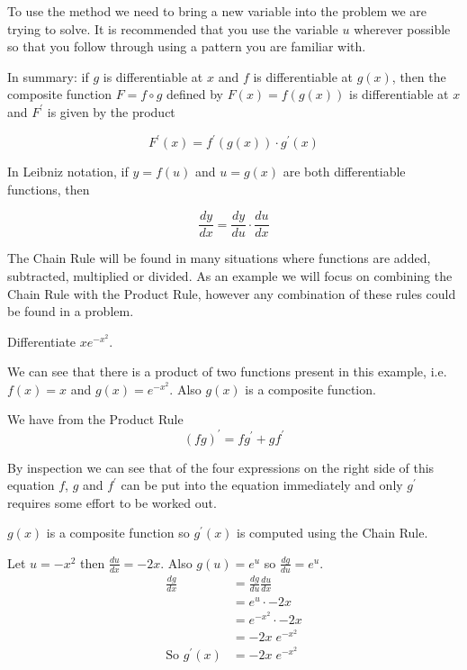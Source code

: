 To use the method we need to bring a new variable into the problem we are trying to solve. It
is recommended that you use the variable $u$ wherever possible so that you follow through using a pattern you are familiar with. 

In summary: if $g$ is differentiable at $x$ and $f$ is differentiable at $g (x)$, then the composite function $F =f \circ g$ defined by $F (x) =f (g (x))$ is differentiable at $x$ and $F^{ \prime }$ is given by the product
\begin{tcolorbox}
\[F^{ \prime } (x) =f^{ \prime } (g (x)) \cdot g^{ \prime } (x)\]
\end{tcolorbox}
In Leibniz notation, if $y =f (u)$ and $u =g (x)$ are both differentiable functions, then
\begin{tcolorbox}
\[\frac{d y}{d x} =\frac{d y}{d u} \cdot \frac{d u}{d x}\]
\end{tcolorbox}

The Chain Rule will be found in many situations where functions are added, subtracted, multiplied or divided. As an example we will focus on combining the Chain Rule with the Product Rule, however any combination of these rules could be found in a problem. 

\example Differentiate $x e^{ -x^{2}}$. 

\solution We can see that there is a product of two functions present in this example, i.e. $f (x) =x$ and $g (x) =e^{ -x^{2}}$. Also $g (x)$ is a composite function. 

We have from the Product Rule
\begin{equation*}\left (f g\right )^{ \prime } =f g^{ \prime } +g f^{ \prime }
\end{equation*}

By inspection we can see that of the four expressions on the right side of this equation $f$, $g$ and $f^{ \prime }$ can be put into the equation immediately and only $g^{ \prime }$ requires some effort to be worked out. 

$g (x)$ is a composite function so $g^{ \prime } (x)$ is computed using the Chain Rule. 

Let $u = -x^{2}$ then $\frac{d u}{d x} = -2 x$. Also $g (u) =e^{u}$ so $\frac{d g}{d u} =e^{u}$.
\begin{align*}\frac{d g}{d x} &  = \frac{d g}{d u} \frac{d u}{d x} \\
 &  = e^{u} \cdot  -2 x \\
 &  = e^{ -x^{2}} \cdot  -2 x \\
 &  =  -2 x\; e^{ -x^{2}} \\
\text{So }g^{ \prime } (x) &  =  -2 x\; e^{ -x^{2}}\end{align*}

